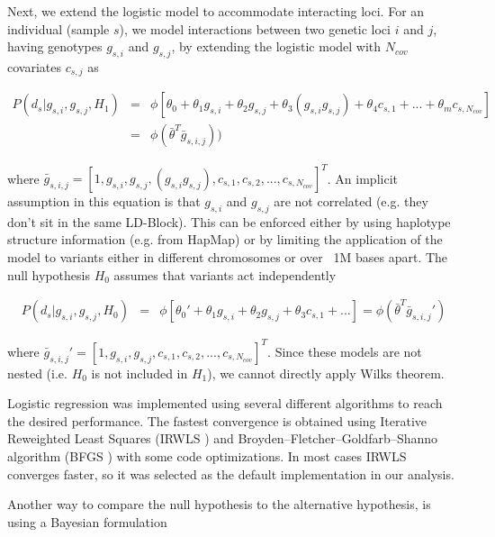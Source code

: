 Next, we extend the logistic model to accommodate interacting loci. For an individual (sample $s$), we model interactions between two genetic loci $i$ and $j$, having genotypes $g_{s,i}$ and $g_{s,j}$, by extending the logistic model with $N_{cov}$ covariates $c_{s,j}$ as

\begin{eqnarray*}
    P( d_s | g_{s,i},g_{s,j}, H_1) & = & \phi[ \theta_0 + \theta_1 g_{s,i} + \theta_2 g_{s,j} + \theta_3 (g_{s,i} g_{s,j}) + \theta_4 c_{s,1} + ... + \theta_m c_{s,N_{cov}} ] \\
    & = & \phi( \bar{\theta}^T \bar{g}_{s,i,j}) )
\end{eqnarray*}

where $\bar{g}_{s,i,j} =  [1, g_{s,i}, g_{s,j}, ( g_{s,i} g_{s,j}), c_{s,1}, c_{s,2}, ..., c_{s,N_{cov}} ]^T$. An implicit assumption in this equation is that $g_{s,i}$ and $g_{s,j}$ are not correlated (e.g. they don't sit in the same LD-Block). This can be enforced either by using haplotype structure information (e.g. from HapMap) or by limiting the application of the model to variants either in different chromosomes or over ~1M bases apart. The null hypothesis $H_0$ assumes that variants act independently

\begin{eqnarray*}
    P( d_s | g_{s,i},g_{s,j}, H_0) & = & 
    \phi[ \theta_0' + \theta_1 g_{s,i} + \theta_2 g_{s,j} + \theta_3 c_{s,1} + ... ] 
    = \phi( \bar{\theta}^T \bar{g}_{s,i,j}' )
\end{eqnarray*}

where $\bar{g}_{s,i,j}' =  [1, g_{s,i}, g_{s,j}, c_{s,1} , c_{s,2}, ..., c_{s,N_{cov}} ]^T$. Since these models are not nested (i.e. $H_0$ is not included in $H_1$), we cannot directly apply Wilks theorem.

Logistic regression was implemented using several different algorithms to reach the desired performance. The fastest convergence is obtained using Iterative Reweighted Least Squares (IRWLS \cite{daubechies2010iteratively}) and Broyden–Fletcher–Goldfarb–Shanno algorithm (BFGS \cite{broyden1970convergence}) with some code optimizations. In most cases IRWLS converges faster, so it was selected as the default implementation in our analysis.

Another way to compare the null hypothesis to the alternative hypothesis, is using a Bayesian formulation \cite{kass1995bayes, wakefield2009bayes}

